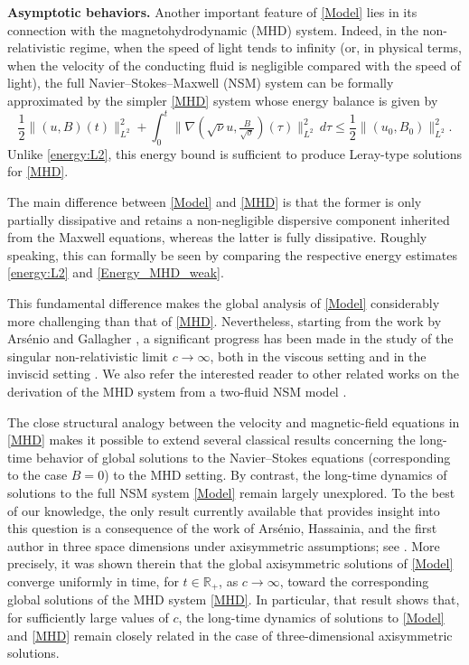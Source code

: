 \documentclass[11pt, leqno, a4paper,]{amsart}
\theoremstyle{remark}
\numberwithin{equation}{section}
\begin{document}
 

\medskip
\noindent\textbf{Asymptotic behaviors.}  
Another important feature of \eqref{Model} lies in its connection with the magnetohydrodynamic (MHD) system. Indeed, in the non-relativistic regime, when the speed of light tends to infinity (or, in physical terms, when the velocity of the conducting fluid is negligible compared with the speed of light), the full Navier--Stokes--Maxwell (NSM) system can be formally approximated by the simpler \eqref{MHD} system whose energy balance  is given by
\begin{equation}\label{Energy_MHD_weak}
\frac{1}{2} \|(u,B)(t)\|_{L^2}^2 
+\int_0^t \|\nabla (\sqrt{\nu} u,\tfrac{B}{\sqrt{\sigma}} )(\tau)\|_{L^2}^2
 \,d\tau
\leq
\frac{1}{2} \|(u_0,B_0)\|_{L^2}^2 .
\end{equation}
Unlike \eqref{energy:L2}, this energy bound is sufficient to produce Leray-type solutions for \eqref{MHD}.

The main difference between \eqref{Model} and \eqref{MHD} is that the former is only partially dissipative and retains a non-negligible dispersive component inherited from the Maxwell equations, whereas the latter is fully dissipative. Roughly speaking, this can formally be seen by comparing the respective energy  estimates \eqref{energy:L2} and \eqref{Energy_MHD_weak}. 

This fundamental difference makes the global analysis of \eqref{Model} considerably more challenging than that of \eqref{MHD}. Nevertheless, starting from the work by Ars\'enio and Gallagher \cite{ag20}, a significant progress has been made in the study of the singular non-relativistic limit $c\to\infty$, both in the viscous setting \cite{ahh24, AHB24, aim15} and in the inviscid setting \cite{ah2, ah, KKL26}. We also refer the interested reader to other related works on the derivation of the MHD system from a two-fluid NSM model \cite{aim15, as, GZ25, JLT20, PWQ22, WYY25, ZZ21}. 

  

The close structural analogy between the velocity and magnetic-field equations in \eqref{MHD} makes it possible to extend several classical results concerning the long-time behavior of global solutions to the Navier--Stokes equations (corresponding to the case $B=0$) to the MHD setting. By contrast, the long-time dynamics of solutions to the full NSM system \eqref{Model} remain largely unexplored. To the best of our knowledge, the only result currently available that provides insight into this question is a consequence of the work of Ars\'enio, Hassainia, and the first author in three space dimensions under axisymmetric assumptions; see \cite[Theorem 1.3]{ahh24}.
 More precisely, it was shown    therein that the global axisymmetric solutions of \eqref{Model} converge uniformly in time, for $t\in\mathbb R_+$, as $c\to\infty$, toward the corresponding global solutions of the MHD system \eqref{MHD}. In particular, that result  shows that, for sufficiently large values of $c$, the long-time dynamics of solutions to \eqref{Model} and \eqref{MHD} remain closely related in the case of three-dimensional axisymmetric solutions. 
\end{document}
